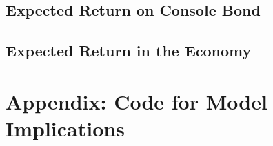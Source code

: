 \documentclass[11pt,reqno,final]{amsart}
\begin{document}
\subsection{Expected Return on Console Bond}

\subsection{Expected Return in the Economy}

%
%
\newpage


%
%
\newpage
\section*{Appendix: Code for Model Implications}
%
\end{document}

